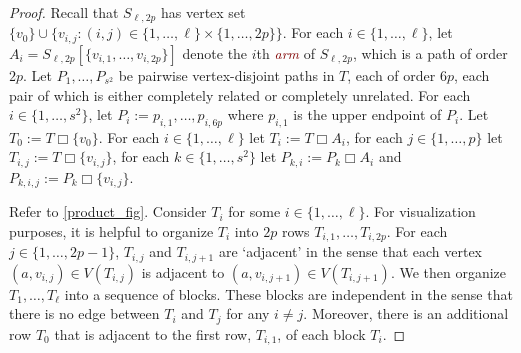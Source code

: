 \documentclass{patmorin}
\newcommand{\defn}[1]{\textcolor{Maroon}{\emph{#1}}}
\newcommand{\boxprod}{\mathbin{\Box}}
\theoremstyle{plain}
\theoremstyle{definition}
\begin{document}
\begin{proof}
  Recall that $S_{\ell,2p}$ has vertex set $\{v_0\}\cup\{v_{i,j}:(i,j)\in \{1,\ldots,\ell\}\times\{1,\ldots,2p\}\}$. For each $i\in\{1,\ldots,\ell\}$, let $A_i=S_{\ell,2p}[\{v_{i,1},\ldots,v_{i,2p}\}]$ denote the $i$th \defn{arm} of $S_{\ell,2p}$, which is a path of order $2p$.  Let $P_1,\ldots,P_{s^2}$ be pairwise vertex-disjoint paths in $T$, each of order $6p$, each pair of which is either completely related or completely unrelated.  For each $i\in\{1,\ldots,s^2 \}$, let $P_i:= p_{i,1},\ldots,p_{i,6p}$ where $p_{i,1}$ is the upper endpoint of $P_i$. 
  Let $T_0:=T\boxprod \{v_0\}$.  For each $i\in\{1,\ldots,\ell\}$ let $T_i:=T\boxprod A_i$, for each $j\in \{1,\ldots,p\}$ let $T_{i,j}:=T\boxprod \{v_{i,j}\}$, for each $k\in\{1,\ldots,s^2\}$ let $P_{k,i}:=P_k\boxprod A_i$ and $P_{k,i,j}:=P_k\boxprod \{v_{i,j}\}$.

  Refer to \cref{product_fig}. 
  Consider $T_i$ for some $i\in\{1,\ldots,\ell\}$. For visualization purposes, it is helpful to organize $T_i$ into $2p$ rows $T_{i,1},\ldots,T_{i,2p}$.  For each $j\in\{1,\ldots,2p-1\}$, $T_{i,j}$ and $T_{i,j+1}$ are `adjacent' in the sense that each vertex $(a,v_{i,j})\in V(T_{i,j})$ is adjacent to $(a,v_{i,j+1})\in V(T_{i,j+1})$.  We then organize $T_1,\ldots,T_{\ell}$ into a sequence of blocks. These blocks are independent in the sense that there is no edge between $T_{i}$ and $T_j$ for any $i\neq j$.  Moreover, there is an additional row $T_0$ that is adjacent to the first row, $T_{i,1}$, of each block $T_i$.


\end{proof}
\end{document}
